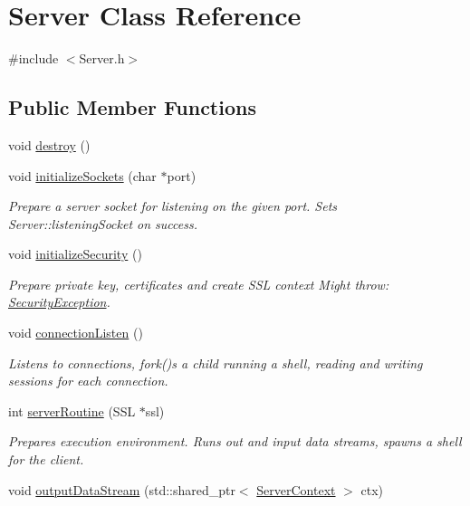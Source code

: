 \hypertarget{classServer}{}\section{Server Class Reference}
\label{classServer}


{\ttfamily \#include $<$Server.\+h$>$}

\subsection*{Public Member Functions}
\begin{DoxyCompactItemize}
\item 
void \hyperlink{classServer_adce993ab4cce22dc732bddddf310a5f6}{destroy} ()
\item 
void \hyperlink{classServer_afee42c59df0ce3e03fa5d6ed2b1cdccc}{initialize\+Sockets} (char $\ast$port)
\begin{DoxyCompactList}\small\item\em Prepare a server socket for listening on the given port. Sets Server\+::listening\+Socket on success. \end{DoxyCompactList}\item 
void \hyperlink{classServer_a54da775247c049b9cc78c92946bb058a}{initialize\+Security} ()
\begin{DoxyCompactList}\small\item\em Prepare private key, certificates and create S\+SL context Might throw\+: \hyperlink{classSecurityException}{Security\+Exception}. \end{DoxyCompactList}\item 
void \hyperlink{classServer_a258c0a0a42d0be99bc4a36b4e6212ed2}{connection\+Listen} ()
\begin{DoxyCompactList}\small\item\em Listens to connections, fork()\textquotesingle{}s a child running a shell, reading and writing sessions for each connection. \end{DoxyCompactList}\item 
int \hyperlink{classServer_a47b6e405d109cdd27838220684f0e2e5}{server\+Routine} (S\+SL $\ast$ssl)
\begin{DoxyCompactList}\small\item\em Prepares execution environment. Runs out and input data streams, spawns a shell for the client. \end{DoxyCompactList}\item 
void \hyperlink{classServer_a0b247f8f2166b36c3575c4678d0755e9}{output\+Data\+Stream} (std\+::shared\+\_\+ptr$<$ \hyperlink{structServerContext}{Server\+Context} $>$ ctx)

\end{DoxyCompactItemize}
